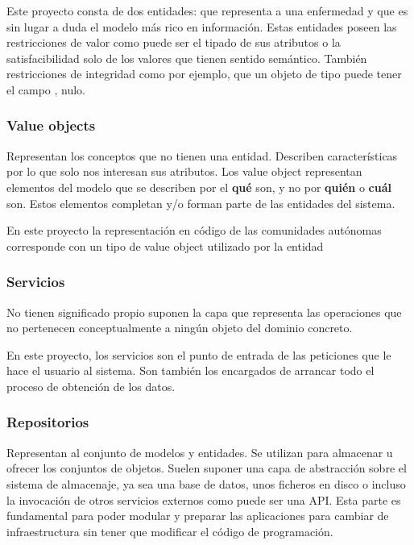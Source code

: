 Este proyecto consta de dos entidades:  que representa a una enfermedad
y  que es sin lugar a duda el modelo más rico en información. Estas
entidades poseen las restricciones de valor como puede ser el tipado de sus atributos o la
satisfacibilidad solo de los valores que tienen sentido semántico. También restricciones
de integridad como por ejemplo, que un objeto de tipo  puede tener el
campo , nulo.

\subsubsection{Value objects}
Representan los conceptos que no tienen una entidad. Describen características por lo que
solo nos interesan sus atributos. Los value object representan elementos del modelo que se
describen por el \textbf{qué} son, y no por \textbf{quién} o \textbf{cuál} son. Estos
elementos completan y/o forman parte de las entidades del sistema.

En este proyecto la representación en código de las comunidades autónomas corresponde con
un tipo de value object utilizado por la entidad 

\subsubsection{Servicios}
No tienen significado propio suponen la capa que representa las operaciones que no
pertenecen conceptualmente a ningún objeto del dominio concreto. 

En este proyecto, los servicios son el punto de entrada de las peticiones que le hace el
usuario al sistema. Son también los encargados de arrancar todo el proceso de obtención de
los datos.

\subsubsection{Repositorios}
Representan al conjunto de modelos y entidades. Se utilizan para almacenar u ofrecer los
conjuntos de objetos. Suelen suponer una capa de abstracción sobre el sistema de
almacenaje, ya sea una base de datos, unos ficheros en disco o incluso la invocación de
otros servicios externos como puede ser una API. Esta parte es fundamental para poder
modular y preparar las aplicaciones para cambiar de infraestructura sin tener que
modificar el código de programación.

